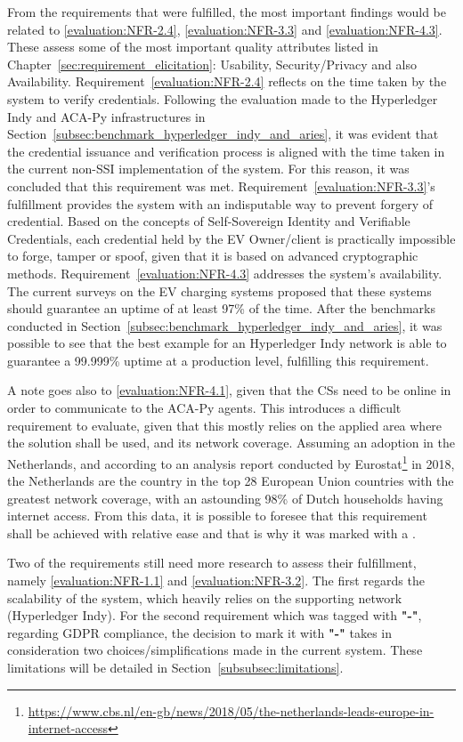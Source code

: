 From the requirements that were fulfilled, the most important findings would be related to \ref{evaluation:NFR-2.4}, \ref{evaluation:NFR-3.3} and \ref{evaluation:NFR-4.3}. These assess some of the most important quality attributes listed in Chapter~\ref{sec:requirement_elicitation}: Usability, Security/Privacy and also Availability. Requirement~\ref{evaluation:NFR-2.4} reflects on the time taken by the system to verify credentials. Following the evaluation made to the Hyperledger Indy and ACA-Py infrastructures in Section~\ref{subsec:benchmark_hyperledger_indy_and_aries}, it was evident that the credential issuance and verification process is aligned with the time taken in the current non-SSI implementation of the system. For this reason, it was concluded that this requirement was met. Requirement~\ref{evaluation:NFR-3.3}'s fulfillment provides the system with an indisputable way to prevent forgery of credential. Based on the concepts of Self-Sovereign Identity and Verifiable Credentials, each credential held by the EV Owner/client is practically impossible to forge, tamper or spoof, given that it is based on advanced cryptographic methods. Requirement~\ref{evaluation:NFR-4.3} addresses the system's availability. The current surveys on the EV charging systems proposed that these systems should guarantee an uptime of at least 97\% of the time. After the benchmarks conducted in Section~\ref{subsec:benchmark_hyperledger_indy_and_aries}, it was possible to see that the best example for an Hyperledger Indy network is able to guarantee a 99.999\% uptime at a production level, fulfilling this requirement. 

A note goes also to \ref{evaluation:NFR-4.1}, given that the CSs need to be online in order to communicate to the ACA-Py agents. This introduces a difficult requirement to evaluate, given that this mostly relies on the applied area where the solution shall be used, and its network coverage. Assuming an adoption in the Netherlands, and according to an analysis report conducted by Eurostat\footnote{\url{https://www.cbs.nl/en-gb/news/2018/05/the-netherlands-leads-europe-in-internet-access}} in 2018, the Netherlands are the country in the top 28 European Union countries with the greatest network coverage, with an astounding 98\% of Dutch households having internet access. From this data, it is possible to foresee that this requirement shall be achieved with relative ease and that is why it was marked with a \greencheck.

Two of the requirements still need more research to assess their fulfillment, namely \ref{evaluation:NFR-1.1} and \ref{evaluation:NFR-3.2}. The first regards the scalability of the system, which heavily relies on the supporting network (Hyperledger Indy). For the second requirement which was tagged with \textbf{"-"}, regarding GDPR compliance, the decision to mark it with \textbf{"-"} takes in consideration two choices/simplifications made in the current system. These limitations will be detailed in Section~\ref{subsubsec:limitations}.

